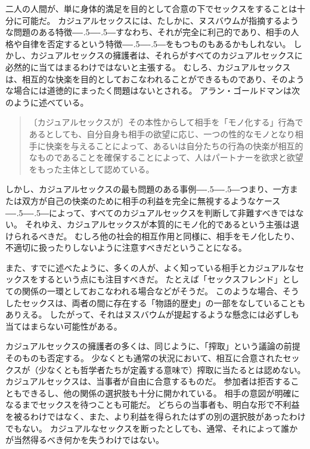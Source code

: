 \documentclass[paper=a4,book,openany]{jlreq}
\newcommand{\ig}[1]{}           %
\def\DDASH{―\kern-.5\zw―\kern-.5\zw―} %
\begin{document}
二人の人間が、単に身体的満足を目的として合意の下でセックスをすることは十分に可能だ。
カジュアルセックスには、たしかに、ヌスバウムが指摘するような問題のある特徴{\DDASH}すなわち、それが完全に利己的であり、相手の人格や自律を否定するという特徴{\DDASH}をもつものもあるかもしれない。
しかし、カジュアルセックスの擁護者は、それらがすべてのカジュアルセックスに必然的に当てはまるわけではないと主張する。
むしろ、カジュアルセックスは、相互的な快楽を目的としておこなわれることができるものであり、そのような場合には道徳的にまったく問題はないとされる。
アラン・ゴールドマンは次のように述べている。

\begin{quote}
〔カジュアルセックスが〕その本性からして相手を「モノ化する」行為であるとしても、自分自身も相手の欲望に応じ、一つの性的なモノとなり相手に快楽を与えることによって、あるいは自分たちの行為の快楽が相互的なものであることを確保することによって、人はパートナーを欲求と欲望をもった主体として認めている。
\citep[p. 283]{goldman77:_plain_sex}\ig{Alan Goldman}
\end{quote}

しかし、カジュアルセックスの最も問題のある事例{\DDASH}つまり、一方または双方が自己の快楽のために相手の利益を完全に無視するようなケース{\DDASH}によって、すべてのカジュアルセックスを判断して非難すべきではない。
それゆえ、カジュアルセックスが本質的にモノ化的であるという主張は退けられるべきだ。
むしろ他の社会的相互作用と同様に、相手をモノ化したり、不適切に扱ったりしないように注意すべきだということになる。

また、すでに述べたように、多くの人が、よく知っている相手とカジュアルなセックスをするという点にも注目すべきだ。
たとえば「セックスフレンド」としての関係の一環としておこなわれる場合などがそうだ。
このような場合、そうしたセックスは、両者の間に存在する「物語的歴史」の一部をなしていることもありえる。
したがって、それはヌスバウムが提起するような懸念には必ずしも当てはまらない可能性がある。

カジュアルセックスの擁護者の多くは、同じように、「搾取」という議論の前提そのものも否定する。
少なくとも通常の状況において、相互に合意されたセックスが（少なくとも哲学者たちが定義する意味で）搾取に当たるとは認めない。
カジュアルセックスは、当事者が自由に合意するものだ。
参加者は拒否することもできるし、他の関係の選択肢も十分に開かれている。
相手の意図が明確になるまでセックスを待つことも可能だ。
どちらの当事者も、明白な形で不利益を被るわけではなく、また、より利益を得られたはずの別の選択肢があったわけでもない。
カジュアルなセックスを断ったとしても、通常、それによって誰かが当然得るべき何かを失うわけではない。
\end{document}
